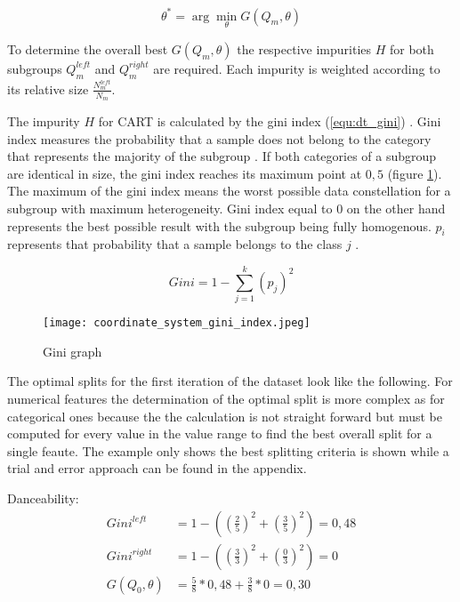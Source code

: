 \begin{equation}
    \theta ^* = \arg \min_{\theta}  G(Q_{m}, \theta)
    \label{equ:dt_min_gain}
\end{equation}

To determine the overall best \(G(Q_{m}, \theta)\) the respective impurities \(H\) for both subgroups \(Q^{left}_{m}\) 
and \(Q^{right}_{m}\) are required. Each impurity is weighted according to its relative size 
\(\frac{N^{left}_{m}}{N_{m}}\).

The impurity \(H\) for \ac{CART} is calculated by the gini index (\ref{equ:dt_gini}) \cite[p.613f]{tangirala2020evaluating}. Gini index measures the probability that a sample 
does not belong to the category that represents the majority of the subgroup \cite[p.335]{James2021}. If both 
categories of a subgroup are identical in size, the gini index reaches its maximum point at \(0,5\) (figure \ref{fig:coordinate_system_initial_dataset}). The 
maximum of the gini index means the worst possible data constellation for a subgroup with maximum heterogeneity. 
Gini index equal to \(0\) on the other hand represents the best possible result with the subgroup being fully 
homogenous. \(p_{i}\) represents that probability that a sample belongs to the class \(j\) \cite[p.335]{James2021}.

\begin{equation}
    Gini = 1 - \sum ^k_{j = 1}(p_{j})^2
    \label{equ:dt_gini}
\end{equation}

\begin{figure}[H]
    \centering
    \caption[]{Gini graph}
	\label{fig:coordinate_system_initial_dataset}
    \texttt{[image: coordinate\_system\_gini\_index.jpeg]}
\end{figure}

The optimal splits for the first iteration of the dataset look like the following. For numerical features the determination of 
the optimal split is more complex as for categorical ones because the the calculation is not straight forward but must be computed
for every value in the value range to find the best overall split for a single feaute. The example only shows the best splitting
criteria is shown while a trial and error approach can be found in the appendix. 

Danceability: 
\begin{equation*}
    \begin{aligned}
        Gini^{left} &= 1 - ((\frac{2}{5})^2 + (\frac{3}{5})^2) = 0,48 
        \\
        Gini^{right}  &= 1 - ((\frac{3}{3})^2 + (\frac{0}{3})^2) = 0 
        \\
        G(Q_{0},\theta) &= \frac{5}{8} * 0,48 + \frac{3}{8} * 0 = 0,30
    \end{aligned}
\end{equation*}

